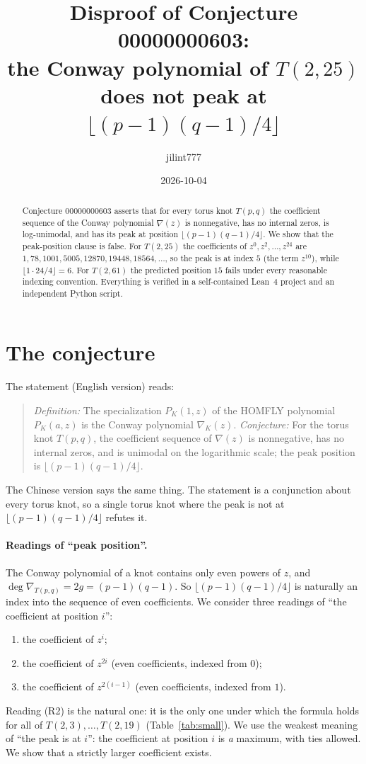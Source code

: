 \documentclass[11pt]{article}
\title{Disproof of Conjecture 00000000603:\\
the Conway polynomial of $T(2,25)$ does not peak at $\lfloor (p-1)(q-1)/4\rfloor$}
\author{jilint777}
\date{2026-10-04}
\theoremstyle{definition}
\theoremstyle{remark}
\begin{document}
\maketitle

\begin{abstract}
Conjecture 00000000603 asserts that for every torus knot $T(p,q)$ the
coefficient sequence of the Conway polynomial $\nabla(z)$ is nonnegative,
has no internal zeros, is log-unimodal, and has its peak at position
$\lfloor (p-1)(q-1)/4\rfloor$. We show that the peak-position clause is false.
For $T(2,25)$ the coefficients of $z^0,z^2,\dots,z^{24}$ are
$1,78,1001,5005,12870,19448,18564,\dots$, so the peak is at index $5$
(the term $z^{10}$), while $\lfloor 1\cdot 24/4\rfloor=6$. For $T(2,61)$
the predicted position $15$ fails under every reasonable indexing convention.
Everything is verified in a self-contained Lean~4 project and an independent
Python script.
\end{abstract}

\section{The conjecture}

The statement (English version) reads:
\begin{quote}
\emph{Definition:} The specialization $P_K(1,z)$ of the HOMFLY polynomial
$P_K(a,z)$ is the Conway polynomial $\nabla_K(z)$.
\emph{Conjecture:} For the torus knot $T(p,q)$, the coefficient sequence of
$\nabla(z)$ is nonnegative, has no internal zeros, and is unimodal on the
logarithmic scale; the peak position is $\lfloor (p-1)(q-1)/4\rfloor$.
\end{quote}
The Chinese version says the same thing. The statement is a conjunction about
every torus knot, so a single torus knot where the peak is not at
$\lfloor (p-1)(q-1)/4\rfloor$ refutes it.

\paragraph{Readings of ``peak position''.}
The Conway polynomial of a knot contains only even powers of $z$, and
$\deg\nabla_{T(p,q)} = 2g = (p-1)(q-1)$. So $\lfloor (p-1)(q-1)/4\rfloor$ is
naturally an index into the sequence of even coefficients. We consider three
readings of ``the coefficient at position $i$'':
\begin{enumerate}
\item[(R1)] the coefficient of $z^{i}$;
\item[(R2)] the coefficient of $z^{2i}$ (even coefficients, indexed from $0$);
\item[(R3)] the coefficient of $z^{2(i-1)}$ (even coefficients, indexed from $1$).
\end{enumerate}
Reading (R2) is the natural one: it is the only one under which the
formula holds for all of $T(2,3),\dots,T(2,19)$ (Table~\ref{tab:small}).
We use the weakest meaning of ``the peak is at $i$'': the coefficient at
position $i$ is \emph{a} maximum, with ties allowed. We show that a strictly
larger coefficient exists.
\end{document}
